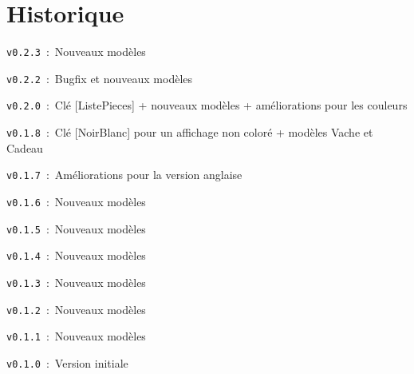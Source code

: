 \documentclass{article}
\begin{document}
\newpage

\part{Historique}

\verb|v0.2.3|~:~Nouveaux modèles

\verb|v0.2.2|~:~Bugfix et nouveaux modèles

\verb|v0.2.0|~:~Clé \textsf{[ListePieces]}  + nouveaux modèles + améliorations pour les couleurs

\verb|v0.1.8|~:~Clé \textsf{[NoirBlanc]} pour un affichage non coloré + modèles \textsf{Vache} et \textsf{Cadeau}

\verb|v0.1.7|~:~Améliorations pour la version anglaise

\verb|v0.1.6|~:~Nouveaux modèles

\verb|v0.1.5|~:~Nouveaux modèles

\verb|v0.1.4|~:~Nouveaux modèles

\verb|v0.1.3|~:~Nouveaux modèles

\verb|v0.1.2|~:~Nouveaux modèles

\verb|v0.1.1|~:~Nouveaux modèles

\verb|v0.1.0|~:~Version initiale
\end{document}
